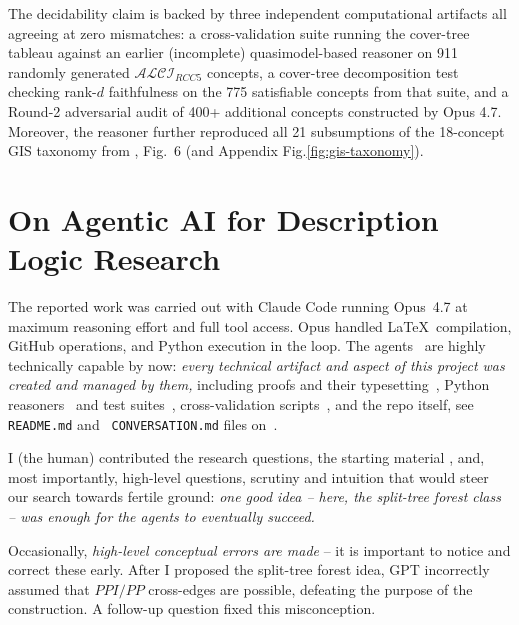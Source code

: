 \documentclass[
]{ceurart}
\theoremstyle{definition}
\newcommand{\ALCIRCC}[1]{\ensuremath{\mathcal{ALCI}_{\mathit{RCC#1}}}}
\begin{document}
The decidability claim is backed by three independent computational
artifacts all agreeing at zero mismatches: a cross-validation suite
running the cover-tree tableau \cite{CoverTreeImpl} against an earlier
(incomplete) quasimodel-based reasoner \cite{QuasimodelReasoner} on
911 randomly generated \ALCIRCC{5} concepts, a cover-tree
decomposition test checking rank-$d$ faithfulness on the 775
satisfiable concepts from that suite, and a Round-2 adversarial audit
of 400+ additional concepts constructed by Opus 4.7. Moreover, the
reasoner further reproduced all 21 subsumptions of the 18-concept GIS
taxonomy from \cite{Wessel2003}, Fig.~6 (and Appendix
Fig.\ref{fig:gis-taxonomy}).
 

\section{On Agentic AI for Description Logic Research}
\label{sec:agentic-ai}
                                                                    

The reported work was carried out with Claude Code running Opus~4.7 at
maximum reasoning effort and full tool access.  Opus handled
\LaTeX\ compilation, GitHub operations, and Python execution in the
loop. The agents~\cite{ClaudeOpus47,GPT54Pro} are highly technically
capable by now: \emph{every technical artifact and aspect of this project
was created and managed by them,} including proofs and their
typesetting~\cite{SiblingCompleted,CoverTree,CompletenessExtraction,
  CoverTreeImpl,TwoTierQuotient,FWProof,TriangleBlocking,
  PatchworkAugmentation,TypedPatchworkCounterexample,
  ResponseGPTBlocking,StatusAfterFW}, Python reasoners~\cite{
  CoverTreeReasoner,QuasimodelReasoner,CyclicReasoner,ModelVerifier}
and test suites~\cite{DecompositionTest,StressTestCoverTree,
  StressTestCyclic,TestCyclicReasoner,GISTaxonomy}, 
cross-validation scripts~\cite{StressTestCoverTree,StressTestCyclic},
and the repo itself, see {\tt README.md} and {\tt
  CONVERSATION.md} files on~\cite{ALCIRCC5Repo,ALCIRCC5Outdated}.
                                                                       

I (the human) contributed the research questions, the starting
material \cite{Wessel2002, Wessel2003, LutzWolter2006}, and, most
importantly, high-level questions, scrutiny and intuition that would
steer our search towards fertile ground: \emph{one good idea -- here, the
split-tree forest class -- was enough for the agents to eventually
succeed.}

Occasionally, \emph{high-level conceptual errors are made} -- it is
important to notice and correct these early. After I proposed the
split-tree forest idea, GPT incorrectly assumed that 
$\mathit{PPI}/\mathit{PP}$ cross-edges are possible, defeating the
purpose of the construction. A follow-up question fixed this 
misconception.
  
\end{document}
